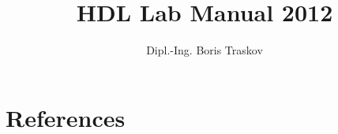 \documentclass[10pt,a4paper]{article}
\title{HDL Lab Manual 2012}
\author{Dipl.-Ing. Boris Traskov}
\begin{document}
\thispagestyle{fancy}
\maketitle

\thispagestyle{fancy}
\tableofcontents
\thispagestyle{fancy}





%



\section{References}
\nocite{*}
{}

\end{document}

